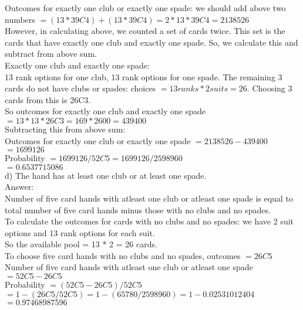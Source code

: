 \documentclass[14pt]{extreport}
\begin{document}
\begin{enumerate}[label=(\alph*)]
Outcomes for exactly one club or exactly one spade: we should add above two numbers $ = (13 * 39C4) + (13 * 39C4) = 2 * 13 * 39C4 = 2138526 $\\

However, in calculating above, we counted a set of cards twice. This set is the cards that have exactly one club and exactly one spade. So, we calculate this and subtract from above sum. \\

Exactly one club and exactly one spade:\\
13 rank options for one club, 13 rank options for one spade. The remaining 3 cards do not have clubs or spades: choices $ = 13 ranks * 2 suits = 26 $. Choosing 3 cards from this is 26C3. \\
So outcomes for exactly one club and exactly one spade $ = 13 * 13 * 26C3  = 169 * 2600 = 439400 $ \\

Subtracting this from above sum:\\
Outcomes for exactly one club or exactly one spade $ = 2138526 - 439400 $ \\
 $ = 1699126 $ \\

Probability $ = 1699126 / 52C5 = 1699126 / 2598960 $ \\
 $= 0.6537715086 $ \\

\newpage
d) The hand has at least one club or at least one spade.\\

Answer: \\
Number of five card hands with atleast one club or atleast one spade is equal to total number of five card hands minus those with no clubs and no spades. \\

To calculate the outcomes for cards with no clubs and no spades: we have 2 suit options and 13 rank options for each suit. \\
So the available pool = 13 * 2 = 26 cards.\\
To choose five card hands with no clubs and no spades, outcomes  $= 26C5$ \\

Number of five card hands with atleast one club or atleast one spade $ = 52C5 - 26C5 $ \\

Probability $ = \left(52C5 - 26C5\right) / 52C5 $ \\
 $= 1 - \left(26C5 / 52C5\right) = 1 - \left(65780 / 2598960 \right) =  1- 0.02531012404$ \\
  $ = 0.97468987596 $ \\
  
  

\end{enumerate}
\newpage
\end{document}
